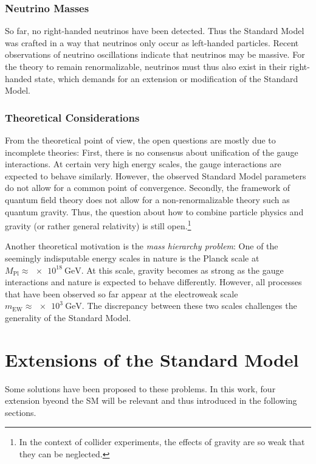 \subsubsection{Neutrino Masses}
So far, no right-handed neutrinos have been detected. Thus the Standard Model was crafted in a way that neutrinos only occur as left-handed particles.
Recent observations of neutrino oscillations\cite{KamLAND:ReactorAntineutrinoMeasurement,DoubleChooz:Improvedmeasurementsneutrino,IceCube:Determiningneutrinooscillation,DayaBay:NewMeasurementAntineutrino} indicate that neutrinos may be massive. For the theory to remain renormalizable, neutrinos must thus also exist in their right-handed state\cite{Klinkhamer:NeutrinomassStandard}, which demands for an extension or modification of the Standard Model.

\subsubsection{Theoretical Considerations}
From the theoretical point of view, the open questions are mostly due to incomplete theories: 
First, there is no consensus about unification of the gauge interactions. At certain very high energy scales, the gauge interactions are expected to behave similarly. However, the observed Standard Model parameters do not allow for a common point of convergence\cite{Amaldi:Comparisongrandunified}.
Secondly, the framework of quantum field theory does not allow for a non-renormalizable theory such as quantum gravity. Thus, the question about how to combine particle physics and gravity (or rather general relativity) is still open.\footnote{In the context of collider experiments, the effects of gravity are so weak that they can be neglected.}

Another theoretical motivation is the \emph{mass hierarchy problem}: One of the seemingly indisputable energy scales in nature is the Planck scale at $M_\text{Pl} \approx \SI{e18}{\GeV}$. At this scale, gravity becomes as strong as the gauge interactions and nature is expected to behave differently. However, all processes that have been observed so far appear at the electroweak scale $m_\text{EW} \approx \SI{e3}{\GeV}$. The discrepancy between these two scales challenges the generality of the Standard Model.


\section{Extensions of the Standard Model}
Some solutions have been proposed to these problems. In this work, four extension byeond the \acl{SM} will be relevant and thus introduced in the following sections.

